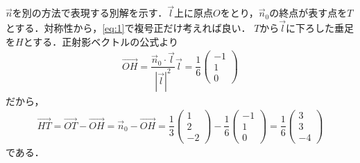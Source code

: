 \documentclass[../../main.tex]{subfiles}
\begin{document}
$\vec{n}$を別の方法で表現する別解を示す．$\vec{l}$上に原点$O$をとり，$\vec{n}_0$の終点が表す点を$T$とする．対称性から，\cref{eq:1}で複号正だけ考えれば良い．
$T$から$\vec{l}$に下ろした垂足を$H$とする．正射影ベクトルの公式より
\begin{align}
  \overrightarrow{OH}
  = \dfrac{\vec{n}_0\cdot\vec{l}}{|\vec{l}|^2}\vec{l}
  = \dfrac{1}{6}
  \begin{pmatrix}-1\\1\\0
  \end{pmatrix}
\end{align}
だから，
\begin{align}
  \overrightarrow{HT}
  = \overrightarrow{OT} - \overrightarrow{OH}
  = \vec{n}_{0} - \overrightarrow{OH}
  =
  \dfrac{1}{3}
  \begin{pmatrix}1\\2\\-2
  \end{pmatrix}-\dfrac{1}{6}
  \begin{pmatrix}-1\\1\\0
  \end{pmatrix}
  = \dfrac{1}{6}
  \begin{pmatrix}3\\3\\-4
  \end{pmatrix} \label{eq:10}
\end{align}
である．
\end{document}
